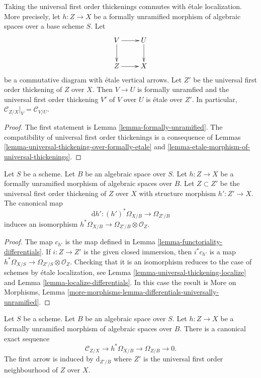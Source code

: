 \begin{lemma}
\label{lemma-universal-thickening-localize}
Taking the universal first order thickenings commutes with \'etale
localization. More precisely, let $h : Z \to X$ be a formally unramified
morphism of algebraic spaces over a base scheme $S$.
Let
$$
\xymatrix{
V \ar[d] \ar[r] & U \ar[d] \\
Z \ar[r] & X
}
$$
be a commutative diagram with \'etale vertical arrows.
Let $Z'$ be the universal first order thickening of $Z$ over $X$.
Then $V \to U$ is formally unramfied and the universal first
order thickening $V'$ of $V$ over $U$ is \'etale over $Z'$.
In particular, $\mathcal{C}_{Z/X}|_V = \mathcal{C}_{V/U}$.
\end{lemma}

\begin{proof}
The first statement is
Lemma \ref{lemma-formally-unramified}.
The compatibility of universal first order thickenings is
a consequence of
Lemmas \ref{lemma-universal-thickening-over-formally-etale} and
\ref{lemma-etale-morphism-of-universal-thickenings}.
\end{proof}

\begin{lemma}
\label{lemma-differentials-universally-unramified}
Let $S$ be a scheme. Let $B$ be an algebraic space over $S$.
Let $h : Z \to X$ be a formally unramified morphism of algebraic spaces
over $B$. Let $Z \subset Z'$ be the universal first order thickening of $Z$
over $X$ with structure morphism $h' : Z' \to X$. The canonical map
$$
\text{d}h' : (h')^*\Omega_{X/B} \to \Omega_{Z'/B}
$$
induces an isomorphism
$h^*\Omega_{X/B} \to \Omega_{Z'/B} \otimes \mathcal{O}_Z$.
\end{lemma}

\begin{proof}
The map $c_{h'}$ is the map defined in
Lemma \ref{lemma-functoriality-differentials}.
If $i : Z \to Z'$ is the given closed immersion, then
$i^*c_{h'}$ is a map
$h^*\Omega_{X/S} \to \Omega_{Z'/S} \otimes \mathcal{O}_Z$.
Checking that it is an isomorphism reduces to the case of schemes
by \'etale localization, see
Lemma \ref{lemma-universal-thickening-localize}
and
Lemma \ref{lemma-localize-differentials}.
In this case the result is
More on Morphisms,
Lemma \ref{more-morphisms-lemma-differentials-universally-unramified}.
\end{proof}

\begin{lemma}
\label{lemma-universally-unramified-differentials-sequence}
Let $S$ be a scheme. Let $B$ be an algebraic space over $S$.
Let $h : Z \to X$ be a formally unramified morphism of algebraic
spaces over $B$.
There is a canonical exact sequence
$$
\mathcal{C}_{Z/X} \to h^*\Omega_{X/B} \to \Omega_{Z/B} \to 0.
$$
The first arrow is induced by $\text{d}_{Z'/B}$ where
$Z'$ is the universal first order neighbourhood of $Z$ over $X$.
\end{lemma}

